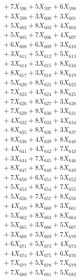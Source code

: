 \documentclass[a4paper,10pt]{article}
\begin{document}
{\begin{align}
&\;  + 7 X_{596} + 5 X_{597} + 6 X_{598} \\[0.3ex]
&\;  + 3 X_{599} + 3 X_{600} + 3 X_{601} \\[0.3ex]
&\;  + 5 X_{602} + 8 X_{603} + 4 X_{604} \\[0.3ex]
&\;  + 5 X_{605} + 7 X_{606} + 4 X_{607} \\[0.3ex]
&\;  + 6 X_{608} + 6 X_{609} + 3 X_{610} \\[0.5ex]\allowbreak
&\;  + 3 X_{611} + 5 X_{612} + 5 X_{613} \\[0.3ex]
&\;  + 3 X_{614} + 3 X_{615} + 8 X_{616} \\[0.3ex]
&\;  + 8 X_{617} + 3 X_{618} + 8 X_{619} \\[0.3ex]
&\;  + 5 X_{620} + 8 X_{621} + 6 X_{622} \\[0.3ex]
&\;  + 7 X_{623} + 4 X_{624} + 8 X_{625} \\[0.3ex]
&\;  + 7 X_{626} + 8 X_{627} + 3 X_{628} \\[0.3ex]
&\;  + 7 X_{629} + 8 X_{630} + 3 X_{631} \\[0.3ex]
&\;  + 4 X_{632} + 8 X_{633} + 4 X_{634} \\[0.3ex]
&\;  + 8 X_{635} + 8 X_{636} + 3 X_{637} \\[0.3ex]
&\;  + 8 X_{638} + 4 X_{639} + 8 X_{640} \\[0.5ex]\allowbreak
&\;  + 4 X_{641} + 4 X_{642} + 7 X_{643} \\[0.3ex]
&\;  + 3 X_{644} + 7 X_{645} + 8 X_{646} \\[0.3ex]
&\;  + 8 X_{647} + 8 X_{648} + 8 X_{649} \\[0.3ex]
&\;  + 7 X_{650} + 6 X_{651} + 5 X_{652} \\[0.3ex]
&\;  + 5 X_{653} + 8 X_{654} + 7 X_{655} \\[0.3ex]
&\;  + 5 X_{656} + 7 X_{657} + 8 X_{658} \\[0.3ex]
&\;  + 4 X_{659} + 8 X_{660} + 3 X_{661} \\[0.3ex]
&\;  + 5 X_{662} + 8 X_{663} + 8 X_{664} \\[0.3ex]
&\;  + 5 X_{665} + 3 X_{666} + 5 X_{667} \\[0.3ex]
&\;  + 3 X_{668} + 5 X_{669} + 7 X_{670} \\[0.5ex]\allowbreak
&\;  + 6 X_{671} + 5 X_{672} + 4 X_{673} \\[0.3ex]
&\;  + 4 X_{674} + 4 X_{675} + 6 X_{676} \\[0.3ex]
&\;  + 7 X_{677} + 5 X_{678} + 7 X_{679} \\[0.3ex]
&\;  + 7 X_{680} + 5 X_{681} + 5 X_{682} \\[0.3ex]

\end{align}}
\end{document}
